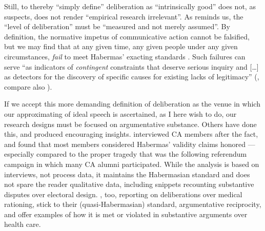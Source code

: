 Still, to thereby ``simply define'' deliberation as ``intrinsically good'' does not, as \citealt[524]{Mutz2008} suspects, does not render ``empirical research irrelevant''.
As \cite[13]{Steiner2012} reminds us, the ``level of deliberation'' must be ``measured and not merely assumed''.
By definition, the normative impetus of communicative action cannot be falsified, but we may find that at any given time, any given people under any given circumstances, \emph{fail} to meet Habermas' exacting standards \citep[499]{Thompson2008}.
Such failures can serve ``as indicators of \emph{contingent} constraints that deserve serious inquiry and [\ldots] as detectors for the discovery of specific causes for existing lacks of legitimacy'' (\citealt[420, emphasis in original]{Habermas2006}, compare also \citealt[502]{Thompson2008}).

If we accept this more demanding definition of deliberation as the venue in which our approximating of ideal speech is ascertained, as I here wish to do, our research designs must be focused on argumentative substance.
Others have done this, and produced encouraging insights. 
\cite{Ratner-2008-aa} interviewed \gls{CA} members after the fact, and found that most members considered Habermas' validity claims honored --- especially compared to the proper tragedy that was the following referendum campaign in which many \gls{CA} alumni participated.
While the analysis is based on interviews, not process data, it maintains the Habermasian standard and does not spare the reader qualitative data, including snippets recounting substantive disputes over electoral design.
\cite{GutmannThompson-2004-aa}, too, reporting on deliberations over medical rationing, stick to their (quasi-Habermasian) standard, argumentative reciprocity, and offer examples of how it is met or violated in substantive arguments over health care.

